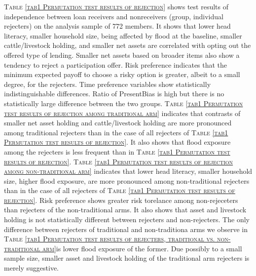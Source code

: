 
	\textsc{\normalsize Table \ref{tab1 Permutation test results of rejection}} shows test results of independence between loan receivers and nonreceivers (group, individual rejecters) on the analysis sample of 772 members. It shows that lower head literacy, smaller household size, being affected by flood at the baseline, smaller cattle/livestock holding, and smaller net assets are correlated with opting out the offered type of lending. Smaller net assets based on broader items also show a tendency to reject a participation offer. \textsf{Risk preference} indicates that the minimum expected payoff to choose a risky option is greater, albeit to a small degree, for the rejecters. Time preference variables show statistically indistinguishable differences. Ratio of \textsf{PresentBias} is high but there is no statistically large difference between the two groups.
	\textsc{\normalsize Table \ref{tab1 Permutation test results of rejection among traditional arm}} indicates that contrasts of smaller net asset holding and cattle/livestock holding are more pronounced among \textsf{traditional} rejecters than in the case of all rejecters of \textsc{\normalsize Table \ref{tab1 Permutation test results of rejection}}. It also shows that flood exposure among the rejecters is less frequent than in \textsc{\normalsize Table \ref{tab1 Permutation test results of rejection}}. 
	\textsc{\normalsize Table \ref{tab1 Permutation test results of rejection among non-traditional arm}} indicates that lower head literacy, smaller household size, higher flood exposure, are more pronounced among non-\textsf{traditional} rejecters than in the case of all rejecters of \textsc{\normalsize Table \ref{tab1 Permutation test results of rejection}}. \textsf{Risk preference} shows greater risk torelance among non-rejeceters than rejecters of the non-\textsf{traditional} arms. It also shows that asset and livestock holding is not statistically different between rejecters and non-rejecters. The only difference between rejecters of \textsf{traditional} and non-\textsf{traditiona} arms we observe in \textsc{\normalsize Table \ref{tab1 Permutation test results of rejecters, traditional vs. non-traditional arm}}is lower flood exposure of the former. Due possibly to a small sample size, smaller asset and livestock holding of the \textsf{traditional} arm rejecters is merely suggestive. 
	
